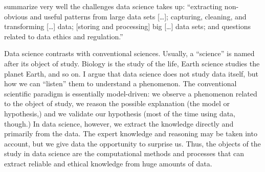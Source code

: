 \textcite{Kelleher2018} summarize very well the challenges data science takes up:
``extracting non-obvious and useful patterns from large data sets [\dots]; capturing,
cleaning, and transforming [\dots] data; [storing and processing] big [\dots] data sets;
and questions related to data ethics and regulation.''

Data science contrasts with conventional sciences.  Usually, a ``science'' is named after
its object of study.  Biology is the study of the life, Earth science studies the planet
Earth, and so on.  I argue that data science does not study data itself, but how we can
``listen'' them to understand a phenomenon.  The conventional scientific paradigm is
essentially model-driven: we observe a phenomenon related to the object of study, we
reason the possible explanation (the model or hypothesis,) and we validate our hypothesis
(most of the time using data, though.)  In data science, however, we extract the knowledge
directly and primarily from the data.  The expert knowledge and reasoning may be taken
into account, but we give data the opportunity to surprise us.  Thus, the objects of the
study in data science are the computational methods and processes that can extract
reliable and ethical knowledge from huge amounts of data.
